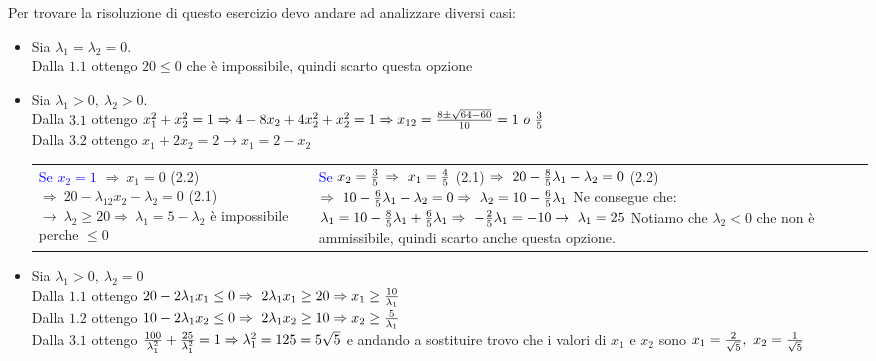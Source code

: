 \documentclass[12pt,a4paper]{article}
\begin{document}
\SmallSep \noindent
Per trovare la risoluzione di questo esercizio devo andare ad analizzare diversi casi:
\begin{itemize}
\item Sia $\lambda_1=\lambda_2=0$.\\
Dalla $1.1$ ottengo $20 \leq 0$ che è impossibile, quindi scarto questa opzione\\
\item Sia $\lambda_1 > 0,\ \lambda_2 > 0$.\\
Dalla $3.1$ ottengo $x_1^2 + x_2^2 = 1 \Rightarrow 4-8x_2+4x_2^2+x_2^2 = 1 \Rightarrow x_{12} = {8 \pm \sqrt{64-60} \over 10} = 1 \ o \ {3\over 5}$\\
Dalla $3.2$ ottengo $x_1+2x_2 = 2 \rightarrow x_1 = 2-x_2$\\

\SmallSep \noindent
\begin{tabular}{l l}
\parbox{0.45\columnwidth}{\textcolor{blue}{Se $x_2 = 1$}\\
$\Rightarrow\ x_1 = 0$\\
(2.2) $\Rightarrow\ 20-\lambda_12x_2 - \lambda_2 = 0$\\
(2.1) $\rightarrow\ \lambda_2 \geq 20 \Rightarrow\ \lambda_1= 5- \lambda_2$ è impossibile perche $\leq 0$} &
\parbox{0.45\columnwidth}{\textcolor{blue}{Se $x_2 = {3\over 5}$}\\
$\Rightarrow\ x_1 = {4\over 5}$\\
(2.1) $\Rightarrow \ 20-{8\over5}\lambda_1 - \lambda_2 = 0$\\
(2.2) $\Rightarrow \ 10-{6\over5}\lambda_1 - \lambda_2 = 0\Rightarrow\ \lambda_2 = 10 - {6\over5}\lambda_1$\\
Ne consegue che: $\lambda_1 = 10-{8\over5} \lambda_1 +{6\over5}\lambda_1 \Rightarrow\ -{2\over5}\lambda_1 = -10 \rightarrow\ \lambda_1 = 25$\\
Notiamo che $\lambda_2 < 0$ che non è ammissibile, quindi scarto anche questa opzione.}\\
\end{tabular}
\item Sia $\lambda_1 > 0,\ \lambda_2 =0$\\
Dalla $1.1$ ottengo $20-2\lambda_1x_1\leq 0 \Rightarrow\ 2\lambda_1x_1 \geq 20 \Rightarrow x_1 \geq {10\over \lambda_1}$\\
Dalla $1.2$ ottengo $10-2\lambda_1x_2\leq 0 \Rightarrow\ 2\lambda_1x_2 \geq 10 \Rightarrow x_2 \geq {5\over \lambda_1}$\\
Dalla $3.1$ ottengo ${100\over \lambda_1^2} + {25 \over \lambda_1^2} = 1 \Rightarrow \lambda_1^2 = 125 = 5\sqrt{5}$ e andando a sostituire trovo che i valori di $x_1$ e $x_2$ sono $x_1 = {2\over \sqrt{5}},\ x_2 = {1 \over \sqrt{5}}$\\

\end{itemize}
\end{document}
